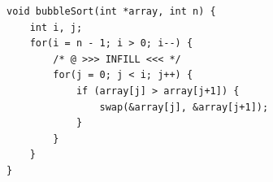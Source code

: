 \documentclass[varwidth=12.85cm]{standalone}
\begin{document}
\begin{verbatim}
void bubbleSort(int *array, int n) {
    int i, j;
    for(i = n - 1; i > 0; i--) {
        /* @ >>> INFILL <<< */
        for(j = 0; j < i; j++) {
            if (array[j] > array[j+1]) {
                swap(&array[j], &array[j+1]);
            }
        }
    }
}
\end{verbatim}
\end{document}
